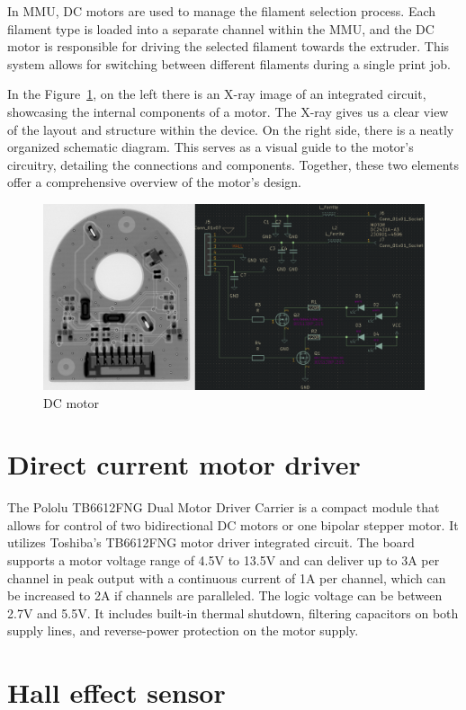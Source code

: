 In MMU, DC motors are used to manage the filament selection process. Each filament type is loaded into a separate channel within the MMU, and the DC motor is responsible for driving the selected filament towards the extruder. This system allows for switching between different filaments during a single print job.

In the Figure~\ref{fig:dc_motor_ic}, on the left there is an X-ray image of an integrated circuit, showcasing the internal components of a motor. The X-ray gives us a clear view of the layout and structure within the device. On the right side, there is a neatly organized schematic diagram. This serves as a visual guide to the motor's circuitry, detailing the connections and components. Together, these two elements offer a comprehensive overview of the motor's design.

\begin{figure}[H]
    \centering
    \includegraphics[width=0.8\linewidth]{img/dc_motor}
    \caption{DC motor}
    \label{fig:dc_motor_ic} 
\end{figure}

\section{Direct current motor driver}

The Pololu TB6612FNG Dual Motor Driver Carrier \cite{motor-driver} is a compact module that allows for control of two bidirectional DC motors or one bipolar stepper motor. It utilizes Toshiba's TB6612FNG motor driver integrated circuit. The board supports a motor voltage range of 4.5V to 13.5V and can deliver up to 3A per channel in peak output with a continuous current of 1A per channel, which can be increased to 2A if channels are paralleled. The logic voltage can be between 2.7V and 5.5V. It includes built-in thermal shutdown, filtering capacitors on both supply lines, and reverse-power protection on the motor supply.

\section{Hall effect sensor}

